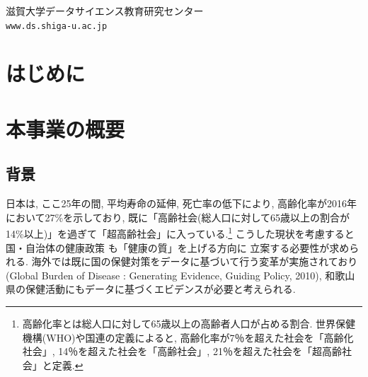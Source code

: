 \documentclass[a4j,11pt,mc, twocolumn]{jreport}
\newcommand{\tb}[1]{\textcolor{blue}{#1}} %
\begin{document}


{
}
{滋賀大学データサイエンス教育研究センター\\ \texttt{www.ds.shiga-u.ac.jp}}

\tableofcontents
\thispagestyle{empty}
\newpage

%

%

\chapter{はじめに}


\chapter{本事業の概要}
\section{背景}
日本は, ここ25年の間, 平均寿命の延伸, 死亡率の低下により, 高齢化率が2016年において27\%を示しており, 既に「高齢社会(総人口に対して65歳以上の割合が14\%以上)」を過ぎて「超高齢社会」に入っている.\footnote{
	高齢化率とは総人口に対して65歳以上の高齢者人口が占める割合. 世界保健機構(WHO)や国連の定義によると, 高齢化率が7％を超えた社会を「高齢化社会」, 14％を超えた社会を「高齢社会」, 21％を超えた社会を「超高齢社会」と定義.
}
こうした現状を考慮すると
国・自治体の健康政策
も「健康の質」を上げる方向に
立案する必要性が求められる.
海外では既に国の保健対策をデータに基づいて行う変革が実施されており(Global Burden of Disease :  Generating Evidence, Guiding Policy, 2010),
和歌山県の保健活動にもデータに基づくエビデンスが必要と考えられる.
\end{document}
